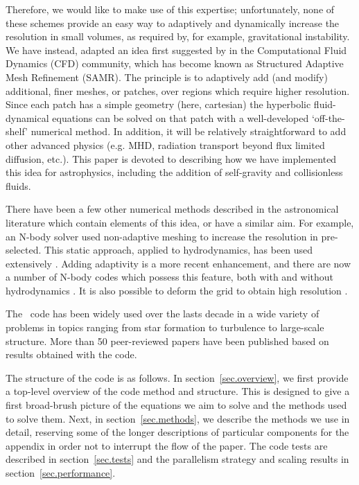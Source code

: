 Therefore, we would like to make use of this expertise; unfortunately, none of these schemes provide an easy way to adaptively and dynamically increase the resolution in small volumes, as required by, for example, gravitational instability.  We have instead, adapted an idea first suggested by \citet{Berger89} in the Computational Fluid Dynamics (CFD) community, which has become known as Structured Adaptive Mesh Refinement (SAMR).  The principle is to adaptively add (and modify) additional, finer meshes, or patches, over regions which require higher resolution.  Since each patch has a simple geometry (here, cartesian) the hyperbolic fluid-dynamical equations can be solved on that patch with a well-developed `off-the-shelf' numerical method.  In addition, it will be relatively straightforward to add other advanced physics (e.g. MHD, radiation transport beyond flux limited diffusion, etc.). This paper is devoted to describing how we have implemented this idea for astrophysics, including the addition of self-gravity and collisionless fluids.

There have been a few other numerical methods described in the astronomical literature which contain elements of this idea, or have a similar aim.  For example, an N-body solver \cite{Villumsen89} used
non-adaptive meshing to increase the resolution in pre-selected.  This static approach, applied to hydrodynamics, has been used extensively \citep[e.g.,]{Ruffert94, Anninos94}.  Adding adaptivity is a more recent enhancement, and there are now a number of N-body codes which possess this feature, both with and without  hydrodynamics  \cite{Couchman91, Jessop94, Suisalu95, Splinter96, Gelato97, ART97, Truelove98, flash_method, MLAPM01,  Yahagi01, RAMSES, Quilis04, Ziegler05, Zhang06}. It is also possible to deform the grid to obtain high resolution \citep[e.g.,][]{Gnedin95, Xu97, Pen98}.

The \enzo\ code has been widely used over the lasts decade in a wide variety of problems in topics ranging from star formation to turbulence to large-scale structure.  More than 50 peer-reviewed papers have been published based on results obtained with the code.

The structure of the code is as follows.  In section~\ref{sec.overview}, we first provide a top-level overview of the code method and structure.  This is designed to give a first broad-brush picture of the equations we aim to solve and the methods used to solve them.  Next, in section~\ref{sec.methods}, we describe the methods we use in detail, reserving some of the longer descriptions of particular components for the appendix in order not to interrupt the flow of the paper.  The code tests are described in section~\ref{sec.tests} and the parallelism strategy and scaling results in section~\ref{sec.performance}.

